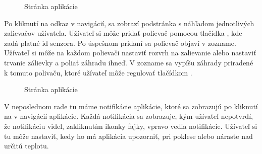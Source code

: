 \documentclass[twoside]{ctuthesis}
\theoremstyle{plain}
\theoremstyle{definition}
\theoremstyle{note}
\begin{document}
\begin{figure}[H]
\caption{Stránka aplikácie }
\label{fig:zalievanie}
\end{figure}

Po kliknutí na odkaz v navigácií\textit {}, sa zobrazí podstránka s náhľadom jednotlivých zalievačov užívateľa. Užívateľ si môže pridať polievač pomocou tlačídka \textit {}, kde zadá platné id senzora. Po úspešnom pridaní sa polievač objaví v zozname. Užívateľ si môže na každom polievači nastaviť rozvrh na zalievanie alebo nastaviť trvanie zálievky a poliať záhradu ihneď. V zozname \textit {} sa vypíšu záhrady priradené k tomuto polivaču, ktoré užívateľ môže regulovať tlačídkom \textit {}.

\begin{figure}[H]
\caption{Stránka aplikácie }
\label{fig:notifikacie}
\end{figure}

V neposlednom rade tu máme notifikácie aplikácie, ktoré sa zobrazujú po kliknutí na \textit {} v navigácií aplikácie.  Každá notifikácia sa zobrazuje, kým užívateľ nepotvrdí, že notifikáciu videl, zakliknutím ikonky fajky, vpravo vedľa notifikácie. Užívateľ si tu môže nastaviť, kedy ho má aplikácia upozorniť, pri poklese alebo náraste nad určitú teplotu.
\end{document}
